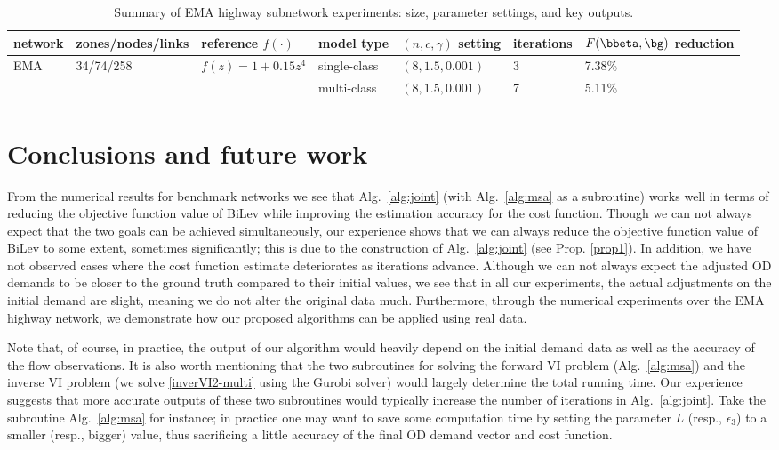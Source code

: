 \documentclass[3p]{elsarticle}
\begin{document}
\begin{table*}[hbt]
	\centering
	\caption{Summary of EMA highway subnetwork experiments: size, parameter settings, and key outputs.} \label{tab2}
	\resizebox{\linewidth}{!}
	{\begin{tabular}{lllllll}
            \toprule[1.2pt]
            \textbf{network}  & \textbf{zones/nodes/links} & \textbf{reference $f(\cdot)$} & model type & \textbf{$(n,c,\gamma)$ setting} & \textbf{iterations} & \textbf{$F(\bbeta,\bg)$ reduction}  \\
            \midrule[1.2pt]
            \multirow{2}{*}{EMA}  & \multirow{2}{*}{34/74/258} & \multirow{2}{*}{$f(z) = 1 + 0.15z^4$} & single-class & $(8,1.5,0.001)$ & 3 & {7.38\%} \\& & & multi-class & $(8,1.5,0.001)$ & 7 & 5.11\% \\
            \bottomrule[1.2pt]
	\end{tabular}}
\end{table*}

	
\section{Conclusions and future work}  \label{sec:conc}
	
	
From the numerical results for benchmark networks we see that
Alg.~\ref{alg:joint} (with Alg.~\ref{alg:msa} as a subroutine) works
well in terms of reducing the objective function value of BiLev while
improving the estimation accuracy for the cost function. Though we can
not always expect that the two goals can be achieved simultaneously, our
experience shows that we can always reduce the objective function value
of BiLev to some extent, sometimes significantly; this is due to the
construction of Alg.~\ref{alg:joint} (see Prop. \ref{prop1}). In
addition, we have not observed cases where the cost function estimate
deteriorates as iterations advance. Although we can not always expect
the adjusted OD demands to be closer to the ground truth compared to
their initial values, we see that in all our experiments, the actual
adjustments on the initial demand are slight, meaning we do not alter
the original data much. Furthermore, through the numerical experiments
over the EMA highway network, we demonstrate how our proposed algorithms
can be applied using real data.
	
Note that, of course, in practice, the output of our algorithm would
heavily depend on the initial demand data as well as the accuracy of the
flow observations. It is also worth mentioning that the two subroutines
for solving the forward VI problem (Alg.~\ref{alg:msa}) and the inverse
VI problem (we solve \eqref{inverVI2-multi} using the Gurobi solver)
would largely determine the total running time. Our experience suggests
that more accurate outputs of these two subroutines would typically
increase the number of iterations in Alg.~\ref{alg:joint}. Take the
subroutine Alg.~\ref{alg:msa} for instance; in practice one may want to
save some computation time by setting the parameter $L$ (resp.,
$\epsilon_3$) to a smaller (resp., bigger) value, thus sacrificing a
little accuracy of the final OD demand vector and cost function.
	
\end{document}

